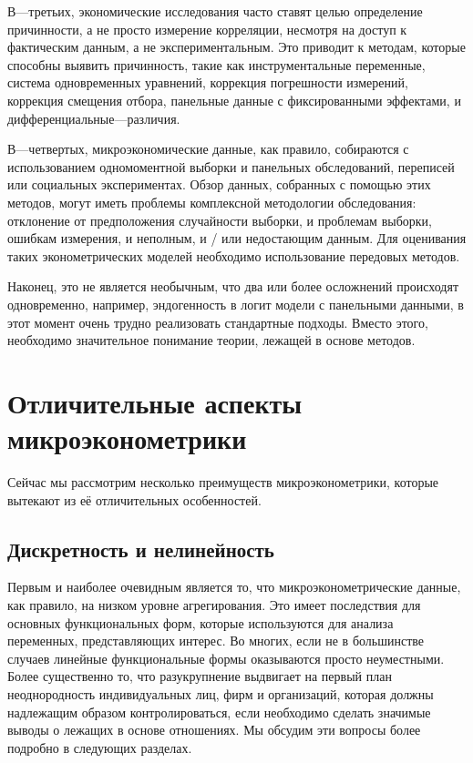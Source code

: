 	
	В---третьих, экономические исследования часто ставят целью определение причинности, а не просто измерение корреляции, несмотря на доступ к фактическим данным, а не экспериментальным. Это приводит к методам, которые способны выявить причинность, такие как инструментальные переменные, система одновременных уравнений, коррекция погрешности измерений, коррекция смещения отбора, панельные данные с фиксированными эффектами, и дифференциальные---различия.
	
	
	В---четвертых, микроэкономические данные, как правило, собираются с использованием одномоментной выборки и панельных обследований, переписей или социальных экспериментах. Обзор данных, собранных с помощью этих методов, могут иметь проблемы комплексной методологии обследования: отклонение от предположения случайности выборки, и проблемам выборки, ошибкам измерения, и неполным, и / или недостающим данным. Для оценивания таких эконометрических моделей необходимо использование передовых методов.
	
	
	Наконец, это не является необычным, что два или более осложнений происходят одновременно, например, эндогенность в логит модели с панельными данными, в этот момент очень трудно реализовать стандартные подходы. Вместо этого, необходимо значительное понимание теории, лежащей в основе методов.


\section{Отличительные аспекты микроэконометрики}

	Сейчас мы рассмотрим несколько преимуществ микроэконометрики, которые вытекают из её отличительных особенностей.

\subsection{Дискретность и нелинейность}

	Первым и наиболее очевидным является то, что микроэконометрические данные, как правило, на низком уровне агрегирования. Это имеет последствия для основных функциональных форм, которые используются для анализа переменных, представляющих интерес. Во многих, если не в большинстве случаев линейные функциональные формы оказываются просто неуместными. Более существенно то, что разукрупнение выдвигает на первый план неоднородность индивидуальных лиц, фирм и организаций, которая должны надлежащим образом контролироваться, если необходимо сделать значимые выводы о лежащих в основе отношениях. Мы обсудим эти вопросы более подробно в следующих разделах.
	
